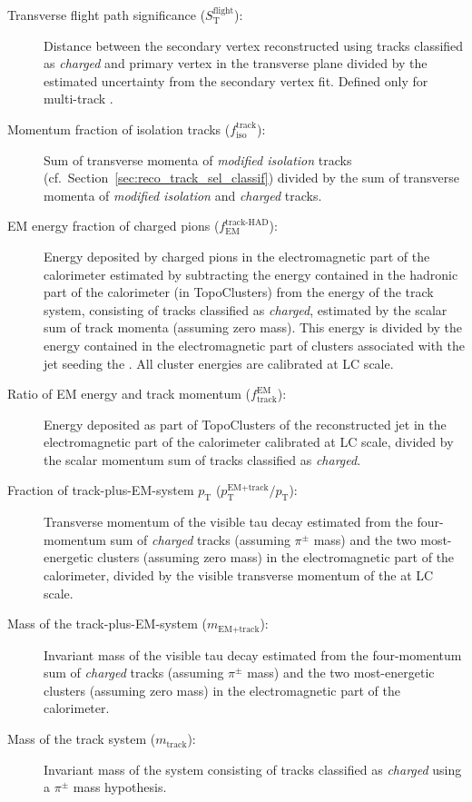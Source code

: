 \begin{description}
\item[Transverse flight path significance ($S_\text{T}^\text{flight}$):]
  Distance between the secondary vertex reconstructed using tracks classified as
  \emph{charged} and primary vertex in the transverse plane divided by the
  estimated uncertainty from the secondary vertex fit. Defined only for
  multi-track \tauhadvis.

\item[Momentum fraction of isolation tracks ($f_\text{iso}^\text{track}$):] Sum
  of transverse momenta of \emph{modified isolation} tracks (cf.\
  Section~\ref{sec:reco_track_sel_classif}) divided by the sum of transverse
  momenta of \emph{modified isolation} and \emph{charged} tracks.

\item[EM energy fraction of charged pions ($f_\text{EM}^\text{track-HAD}$):]
  Energy deposited by charged pions in the electromagnetic part of the
  calorimeter estimated by subtracting the energy contained in the hadronic part
  of the calorimeter (in TopoClusters) from the energy of the track
  system, consisting of tracks classified as \emph{charged}, estimated by the
  scalar sum of track momenta (assuming zero mass). This energy is divided by
  the energy contained in the electromagnetic part of clusters associated with
  the jet seeding the \tauhadvis. All cluster energies are calibrated at LC
  scale.

\item[Ratio of EM energy and track momentum ($f_\text{track}^\text{EM}$):]
  Energy deposited as part of TopoClusters of the reconstructed jet in
  the electromagnetic part of the calorimeter calibrated at LC scale, divided by
  the scalar momentum sum of tracks classified as \emph{charged}.

\item[Fraction of track-plus-EM-system $p_\text{T}$
  ($p_\text{T}^\text{EM+track} / p_\text{T}$):] Transverse momentum of the
  visible tau decay estimated from the four-momentum sum of \emph{charged}
  tracks (assuming $\pi^\pm$ mass) and the two most-energetic clusters (assuming
  zero mass) in the electromagnetic part of the calorimeter, divided by the
  visible transverse momentum of the \tauhadvis at LC scale.

\item[Mass of the track-plus-EM-system ($m_\text{EM+track}$):] Invariant mass of
  the visible tau decay estimated from the four-momentum sum of \emph{charged}
  tracks (assuming $\pi^\pm$ mass) and the two most-energetic clusters (assuming
  zero mass) in the electromagnetic part of the calorimeter.

\item[Mass of the track system ($m_\text{track}$):] Invariant mass of the system
  consisting of tracks classified as \emph{charged} using a $\pi^\pm$ mass
  hypothesis.
\end{description}
